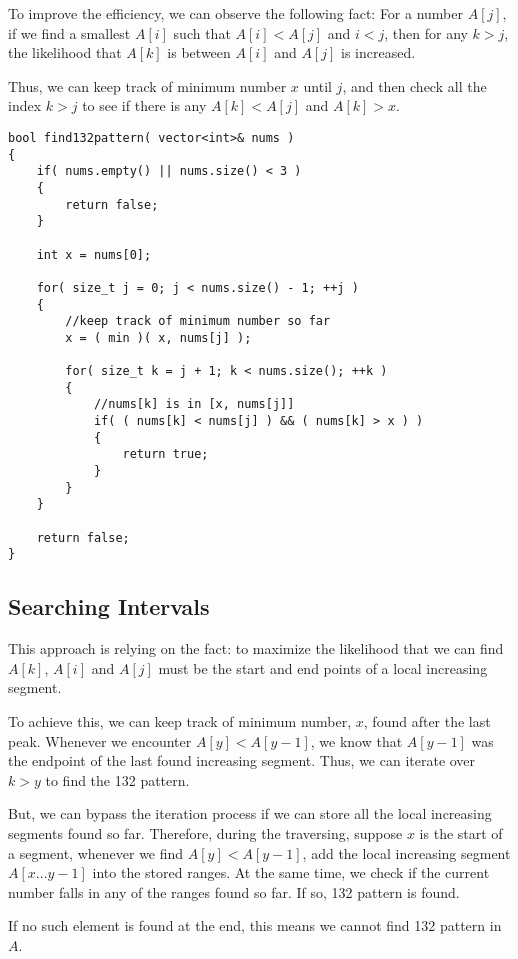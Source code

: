 To improve the efficiency, we can observe the following fact: For a number $A[j]$, if we find a smallest $A[i]$ such that $A[i] < A[j]$ and $i<j$, then for any $k> j$, the likelihood that $A[k]$ is between $A[i]$ and $A[j]$ is increased.

Thus, we can keep track of minimum number $x$ until $j$, and then check all the index $k> j$ to see if there is any $A[k]<A[j]$ and $A[k]> x$.

\setcounter{lstlisting}{0}
\begin{lstlisting}[style=customc, caption={Better Brute Force}]
bool find132pattern( vector<int>& nums )
{
    if( nums.empty() || nums.size() < 3 )
    {
        return false;
    }

    int x = nums[0];

    for( size_t j = 0; j < nums.size() - 1; ++j )
    {
        //keep track of minimum number so far
        x = ( min )( x, nums[j] );

        for( size_t k = j + 1; k < nums.size(); ++k )
        {
            //nums[k] is in [x, nums[j]]
            if( ( nums[k] < nums[j] ) && ( nums[k] > x ) )
            {
                return true;
            }
        }
    }

    return false;
}
\end{lstlisting}

\subsection{Searching Intervals}
This approach is relying on the fact: to maximize the likelihood that we can find $A[k]$, $A[i]$ and $A[j]$ must be the start and end points of a local increasing segment. 

To achieve this, we can keep track of minimum number, $x$, found after the last peak.  Whenever we encounter $A[y] < A[y-1]$, we know that $A[y-1]$ was the endpoint of the last found increasing segment. Thus, we can iterate over $k > y$ to find the 132 pattern.

But, we can bypass the iteration process if we can store all the local increasing segments found so far. Therefore, during the traversing, suppose $x$ is the start of a segment, whenever we find $A[y] < A[y-1]$, add the local increasing segment $A[x\ldots y-1]$ into the stored ranges. At the same time, we check if the current number falls in any of the ranges found so far. If so, 132 pattern is found.

If no such element is found at the end, this means we cannot find 132 pattern in $A$.

